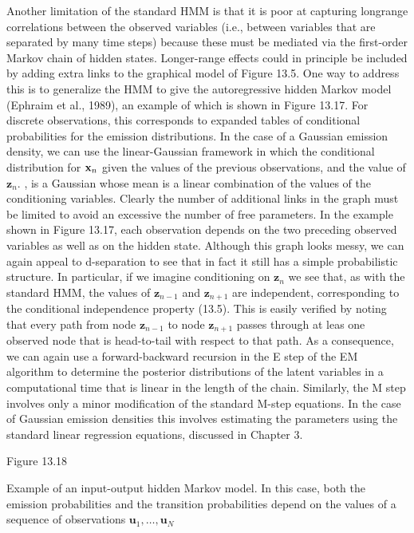 \documentclass[
  10
]{article}
\begin{document}
Another limitation of the standard HMM is that it is poor at capturing
longrange correlations between the observed variables (i.e., between
variables that are separated by many time steps) because these must be
mediated via the first-order Markov chain of hidden states. Longer-range
effects could in principle be included by adding extra links to the
graphical model of Figure 13.5. One way to address this is to generalize
the HMM to give the autoregressive hidden Markov model (Ephraim et al.,
1989), an example of which is shown in Figure 13.17. For discrete
observations, this corresponds to expanded tables of conditional
probabilities for the emission distributions. In the case of a Gaussian
emission density, we can use the linear-Gaussian framework in which the
conditional distribution for \({ \bf x } _ { n }\) given the values of
the previous observations, and the value of \(\mathbf { z } _ { n } .\)
, is a Gaussian whose mean is a linear combination of the values of the
conditioning variables. Clearly the number of additional links in the
graph must be limited to avoid an excessive the number of free
parameters. In the example shown in Figure 13.17, each observation
depends on the two preceding observed variables as well as on the hidden
state. Although this graph looks messy, we can again appeal to
d-separation to see that in fact it still has a simple probabilistic
structure. In particular, if we imagine conditioning on
\(\mathbf { z } _ { n }\) we see that, as with the standard HMM, the
values of \(\mathbf { z } _ { n - 1 }\) and
\(\mathbf { z } _ { n + 1 }\) are independent, corresponding to the
conditional independence property (13.5). This is easily verified by
noting that every path from node \(\mathbf { z } _ { n - 1 }\) to node
\(\mathbf { z } _ { n + 1 }\) passes through at leas one observed node
that is head-to-tail with respect to that path. As a consequence, we can
again use a forward-backward recursion in the E step of the EM algorithm
to determine the posterior distributions of the latent variables in a
computational time that is linear in the length of the chain. Similarly,
the M step involves only a minor modification of the standard M-step
equations. In the case of Gaussian emission densities this involves
estimating the parameters using the standard linear regression
equations, discussed in Chapter 3.

Figure 13.18

Example of an input-output hidden Markov model. In this case, both the
emission probabilities and the transition probabilities depend on the
values of a sequence of observations
\(\mathbf { u } _ { 1 } , \ldots , \mathbf { u } _ { N }\)
\end{document}
